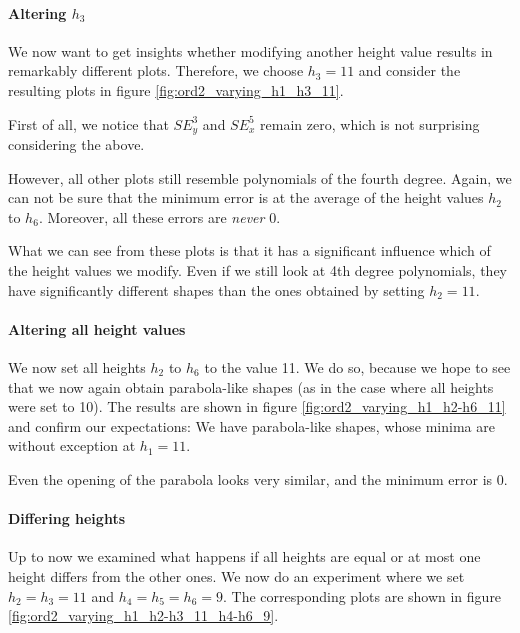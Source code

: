\documentclass{article}
\begin{document}
\paragraph{\texorpdfstring{Altering $h_3$}{Altering h3}}

We now want to get insights whether modifying another height value results in remarkably different plots. Therefore, we choose $h_3=11$ and consider the resulting plots in figure \ref{fig:ord2_varying_h1_h3_11}.



First of all, we notice that $SE_y^3$ and $SE_x^5$ remain zero, which is not surprising considering the above.

However, all other plots still resemble polynomials of the fourth degree. Again, we can not be sure that the minimum error is at the average of the height values $h_2$ to $h_6$. Moreover, all these errors are \emph{never} 0.

What we can see from these plots is that it has a significant influence which of the height values we modify. Even if we still look at 4th degree polynomials, they have significantly different shapes than the ones obtained by setting $h_2=11$.

\paragraph{Altering all height values}

We now set all heights $h_2$ to $h_6$ to the value 11. We do so, because we hope to see that we now again obtain parabola-like shapes (as in the case where all heights were set to 10). The results are shown in figure \ref{fig:ord2_varying_h1_h2-h6_11} and confirm our expectations: We have parabola-like shapes, whose minima are without exception at $h_1=11$.



Even the opening of the parabola looks very similar, and the minimum error is 0.

\paragraph{Differing heights}

Up to now we examined what happens if all heights are equal or at most one height differs from the other ones. We now do an experiment where we set $h_2=h_3=11$ and $h_4=h_5=h_6=9$. The corresponding plots are shown in figure \ref{fig:ord2_varying_h1_h2-h3_11_h4-h6_9}.
\end{document}
